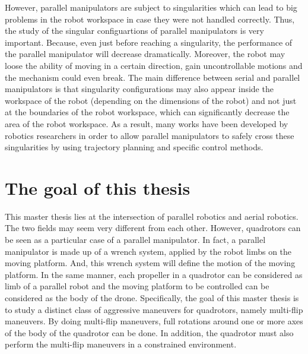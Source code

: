 \documentclass{thesisreport}
\begin{document}
\pagebreak

However, parallel manipulators are subject to singularities which can lead to big problems in the robot workspace in case they were not handled correctly. Thus, the study of the singular configuartions of parallel manipulators is very important. Because, even just before reaching a singularity, the performance of the parallel manipulator will decrease dramatically. Moreover, the robot may loose the ability of moving in a certain direction, gain uncontrollable motions and the mechanism could even break. The main difference between serial and parallel manipulators is that singularity configurations may also appear inside the workspace of the robot (depending on the dimensions of the robot) and not just at the boundaries of the robot workspace, which can significantly decrease the area of the robot workspace.
As a result, many works have been developed by robotics researchers in order to allow parallel manipulators to safely cross these singularities by using trajectory planning and specific control methods.

\section*{The goal of this thesis}

This master thesis lies at the intersection of parallel robotics and aerial robotics. The two fields may seem very different from each other. However, quadrotors can be seen as a particular case of a parallel manipulator. 
In fact, a parallel manipulator is made up of a wrench system, applied by the robot limbs on the moving platform. And, this wrench system will define the motion of the moving platform. In the same manner, each propeller in a quadrotor can be considered as limb of a parallel robot and the moving platform to be controlled can be considered as the body of the drone. 
Specifically, the goal of this master thesis is to study a distinct class of aggressive maneuvers for quadrotors, namely multi-flip maneuvers. By doing multi-flip maneuvers, full rotations around one or more axes of the body of the quadrotor can be done. In addition, the quadrotor must also perform the multi-flip maneuvers in a constrained environment.
\end{document}
